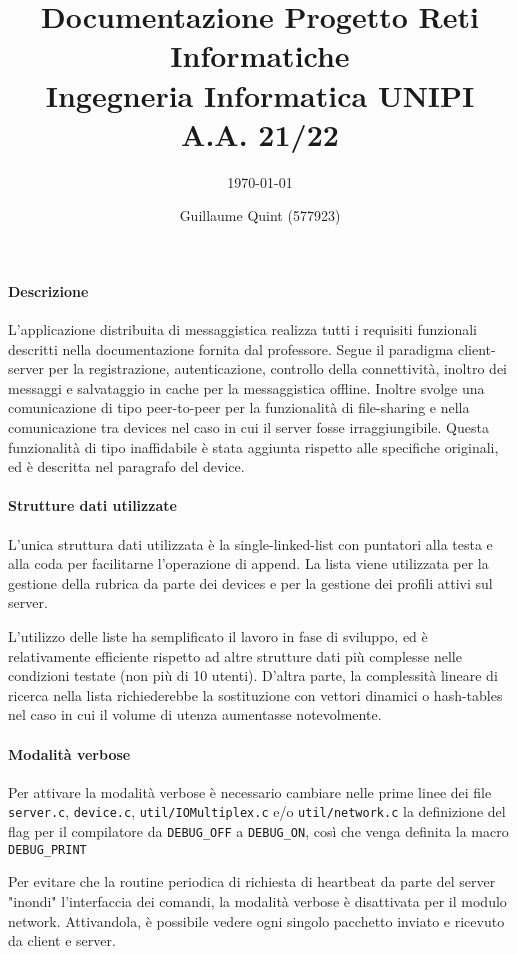 \documentclass[11pt,a4paper,twocolumn,twoside]{paper}
\author{Guillaume Quint (577923)}
\title{\vspace{-4em}Documentazione Progetto Reti Informatiche\\Ingegneria Informatica UNIPI A.A. 21/22}
\subtitle{\today}
\begin{document}
\maketitle

\paragraph{Descrizione}
	L'applicazione distribuita di messaggistica realizza tutti i
    requisiti funzionali descritti nella documentazione fornita dal
    professore. Segue il paradigma client-server per la registrazione,
    autenticazione, controllo della connettività, inoltro dei messaggi e
    salvataggio in cache per la messaggistica offline. Inoltre svolge
    una comunicazione di tipo peer-to-peer per la funzionalità di
    file-sharing e nella comunicazione tra devices nel caso in cui il
    server fosse irraggiungibile. Questa funzionalità di tipo
    inaffidabile è stata aggiunta rispetto alle specifiche originali, ed
    è descritta nel paragrafo del device.
\paragraph{Strutture dati utilizzate}
	L'unica struttura dati utilizzata è la single-linked-list con
    puntatori alla testa e alla coda per facilitarne l'operazione di
    append. La lista viene utilizzata per la gestione della rubrica da
    parte dei devices e per la gestione dei profili attivi sul server.

    L'utilizzo delle liste ha semplificato il lavoro in fase di
    sviluppo, ed è relativamente efficiente rispetto ad altre strutture
    dati più complesse nelle condizioni testate (non più di 10 utenti).
    D'altra parte, la complessità lineare di ricerca nella lista
    richiederebbe la sostituzione con vettori dinamici o hash-tables nel
    caso in cui il volume di utenza aumentasse notevolmente.
\paragraph{Modalità verbose}
    Per attivare la modalità verbose è necessario cambiare nelle prime
    linee dei file \texttt{server.c}, \texttt{device.c},
    \texttt{util/IOMultiplex.c} e/o \texttt{util/network.c} la
    definizione del flag per il compilatore da \texttt{DEBUG\_OFF} a
    \texttt{DEBUG\_ON}, così che venga definita la macro
    \texttt{DEBUG\_PRINT}

    Per evitare che la routine periodica di richiesta di heartbeat da
    parte del server "inondi" l'interfaccia dei comandi, la modalità
    verbose è disattivata per il modulo network. Attivandola, è
    possibile vedere ogni singolo pacchetto inviato e ricevuto da client
    e server.
\end{document}
